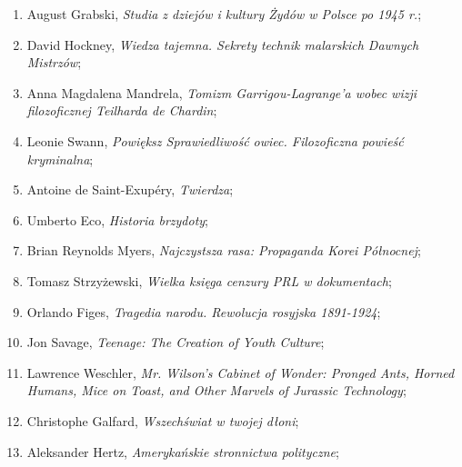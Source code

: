 \documentclass[a4paper,11pt]{article}
\begin{document}
\begin{enumerate}
\item August Grabski, \textit{Studia z dziejów i kultury Żydów w Polsce
    po 1945 r.};



\item David Hockney, \textit{Wiedza tajemna. Sekrety technik malarskich
    Dawnych Mistrzów};



\item Anna Magdalena Mandrela, \textit{Tomizm Garrigou-Lagrange’a wobec
    wizji filozoficznej Teilharda de Chardin};



\item Leonie Swann, \textit{Powiększ Sprawiedliwość owiec. Filozoficzna
    powieść kryminalna};



\item Antoine de Saint-Exupéry, \textit{Twierdza};



\item Umberto Eco, \textit{Historia brzydoty};



\item Brian Reynolds Myers, \textit{Najczystsza rasa: Propaganda Korei
    Północnej};



\item Tomasz Strzyżewski, \textit{Wielka księga cenzury PRL w
    dokumentach};



\item Orlando Figes, \textit{Tragedia narodu. Rewolucja rosyjska
    1891-1924};



\item Jon Savage, \textit{Teenage: The Creation of Youth Culture};



\item Lawrence Weschler, \textit{Mr. Wilson's Cabinet of Wonder: Pronged
    Ants, Horned Humans, Mice on Toast, and Other Marvels of Jurassic
    Technology};



\item Christophe Galfard, \textit{Wszechświat w twojej dłoni};



\item Aleksander Hertz, \textit{Amerykańskie stronnictwa polityczne};




\end{enumerate}
\end{document}
